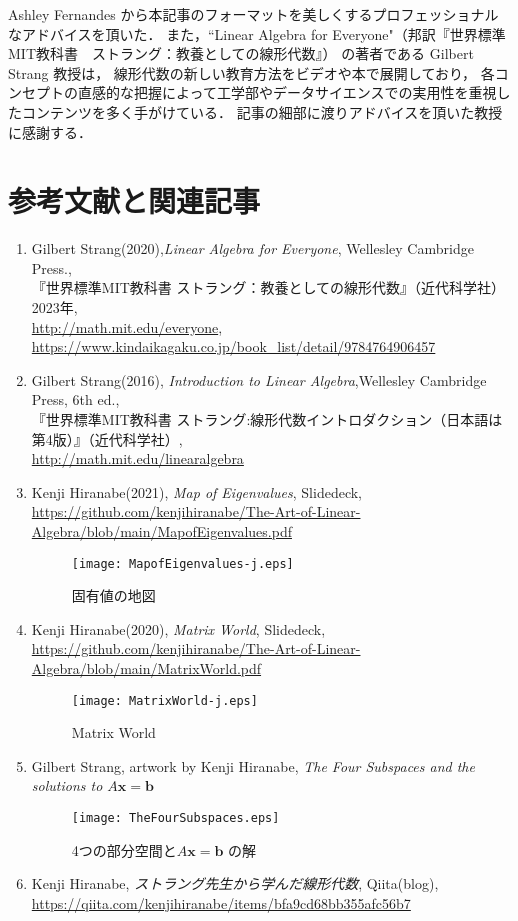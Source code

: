 \documentclass[letterpaper]{article}
\begin{document}
Ashley Fernandes から本記事のフォーマットを美しくするプロフェッショナルなアドバイスを頂いた．
また，``Linear Algebra for Everyone"（邦訳『世界標準MIT教科書　ストラング：教養としての線形代数』） の著者である Gilbert Strang 教授は，
線形代数の新しい教育方法をビデオや本で展開しており，
各コンセプトの直感的な把握によって工学部やデータサイエンスでの実用性を重視したコンテンツを多く手がけている．
記事の細部に渡りアドバイスを頂いた教授に感謝する．

\section*{参考文献と関連記事}
\begin{enumerate}
  \item 
  Gilbert Strang(2020),\emph{Linear Algebra for Everyone}, Wellesley Cambridge Press.,\\
  『世界標準MIT教科書 ストラング：教養としての線形代数』（近代科学社）2023年,\\
  \url{http://math.mit.edu/everyone},\\
  \url{https://www.kindaikagaku.co.jp/book_list/detail/9784764906457}
  \item
  Gilbert Strang(2016), \emph{Introduction to Linear Algebra},Wellesley Cambridge Press, 6th ed.,\\
  『世界標準MIT教科書 ストラング:線形代数イントロダクション（日本語は第4版）』（近代科学社）,\\
  \url{http://math.mit.edu/linearalgebra}
  \item Kenji Hiranabe(2021), \emph{Map of Eigenvalues}, Slidedeck,\\
  \url{https://github.com/kenjihiranabe/The-Art-of-Linear-Algebra/blob/main/MapofEigenvalues.pdf}\\
  \begin{figure}[H]
    \texttt{[image: MapofEigenvalues-j.eps]}
    \caption{固有値の地図}
  \end{figure}
  \item Kenji Hiranabe(2020), \emph{Matrix World}, Slidedeck,\\
  \url{https://github.com/kenjihiranabe/The-Art-of-Linear-Algebra/blob/main/MatrixWorld.pdf}\\
  \begin{figure}[H]
    \centering
    \texttt{[image: MatrixWorld-j.eps]}
    \caption{Matrix World}
  \end{figure}
  \item Gilbert Strang, artwork by Kenji Hiranabe, \emph{The Four Subspaces and the solutions to $A\bm{x}=\bm{b}$}\\
  \begin{figure}[H]
    \centering
    \texttt{[image: TheFourSubspaces.eps]}
    \caption{4つの部分空間と$A\bm{x}=\bm{b}$ の解}
  \end{figure}
  \item Kenji Hiranabe, \emph{ストラング先生から学んだ線形代数}, Qiita(blog),\\
  \url{https://qiita.com/kenjihiranabe/items/bfa9cd68bb355afc56b7}
 \end{enumerate}
\end{document}

